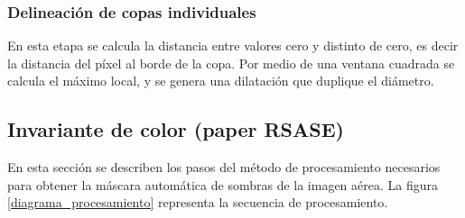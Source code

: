 \subsubsection{Delineación de copas individuales}
En esta etapa se calcula la distancia entre valores cero y distinto de cero, es decir la distancia del píxel al borde de la copa. Por medio de una ventana cuadrada se calcula el máximo local, y se genera una dilatación que duplique el diámetro.





\subsection{Invariante de color (paper RSASE)} \label{Metodología IIC}
En esta sección se describen los pasos del método de procesamiento necesarios para obtener la máscara automática de sombras de la imagen aérea. La figura \ref{diagrama_procesamiento} representa la secuencia de procesamiento.

